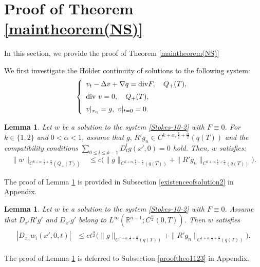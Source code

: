 \documentclass{amsart}
\newtheorem{lemma}[defn]{Lemma}
\numberwithin{equation}{section}
\newcommand{\na}{\nabla}
\newcommand {\al}{\alpha}
\newcommand{\Rn}{{\mathbb R}^{n-1}}
\newcommand{\De}{\Delta}
\begin{document}

\section{Proof of Theorem \ref{maintheorem(NS)}}\label{NS-thm}
\setcounter{equation}{0}
In this section, we provide the proof of Theorem \ref{maintheorem(NS)}


We first  investigate the Hölder continuity of solutions to the following system:
\begin{align}\label{Stokes-10-2}
\left\{\begin{array}{l}\vspace{2mm}
 v_t - \De v+  \na q ={\rm div } F, \quad Q_+(T),\\
\vspace{2mm}
\mbox{div } v =0,  \quad  Q_+(T),\\
v|_{x_n} =g, \,\, v|_{t =0} =0. 
\end{array}
\right.
\end{align}





\begin{lemma}\label{so}
Let  $w$ be a solution to  the system \eqref{Stokes-10-2} with   $ F \equiv 0$. For $ k \in \{1,2\}$ and $ 0 < \al < 1$, assume that
   $g, \, R' g_n  \in   C^{ k +\al, \frac{k}2 +\frac{\al}2} (q(T)) $ and the compatibility conditions $  \sum_{ 0 \leq l \leq k-1}  D^{l}_t g(x',0)   =0$ hold.  Then,    $w$ satisfies:
\begin{align*}
\| w\|_{    C^{ k +\al, \frac{k}2 +\frac{\al}2}  (Q_+(T) )} &  \leq c \Big( \| g\|_{   C^{ k +\al, \frac{k}2 +\frac{\al}2} (q(T)) }  
+ \|R' g_n \|_{  C^{ k +\al, \frac{k}2 +\frac{\al}2} (q(T) ) }  \Big).
\end{align*}
\end{lemma}
The proof of Lemma \ref{so} is provided in Subsection \ref{existenceofsolution2} in Appendix.


\begin{lemma}\label{theo1123}
Let  $w$ be a solution to  the system \eqref{Stokes-10-2} with  $ F \equiv 0$.   Assume that $D_{x'}R' g'$ and $D_{x'}  g'$ belong to  $L^\infty(\Rn;  C^{ \frac{\al}2}( 0, T))$. Then $w$ satisfies
\begin{align*} %
\begin{split}
|D_{x_n}w_i (x',0,t)|  & \leq c  t^\frac{\al}2 \Big(  \|  g\|_{ C^{1 +\al,\frac12 +\frac{\al}2}(q (  T))}  +  \| R' g_n \|_{ C^{1 +\al,\frac12 +\frac{\al}2}(q ( T))}     \Big).
\end{split}
\end{align*}
\end{lemma}
The proof of Lemma \ref{theo1123} is deferred to Subsection \ref{prooftheo1123}  in Appendix.
 
\end{document}
